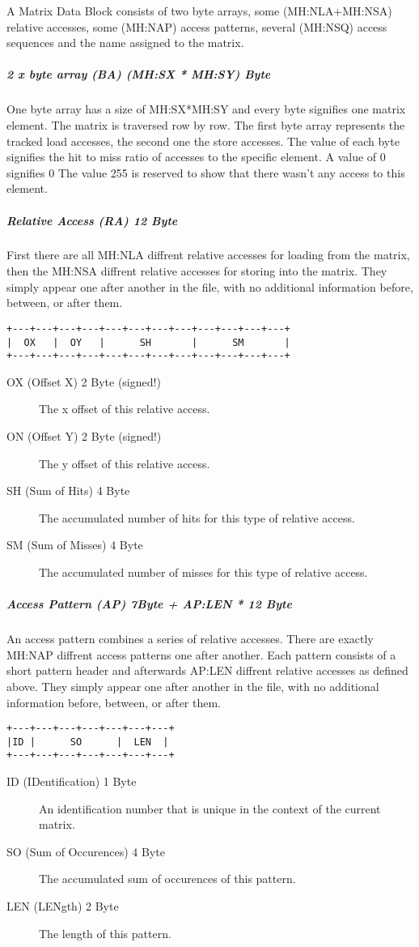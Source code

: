 A Matrix Data Block consists of two byte arrays, some (MH:NLA+MH:NSA) relative accesses, some (MH:NAP) access 
patterns, several (MH:NSQ) access sequences and the name assigned to the matrix.

\subparagraph{2 x byte array (BA) (MH:SX * MH:SY) Byte}

One byte array has a size of MH:SX*MH:SY and every byte signifies one matrix element. The matrix is traversed 
row by row. The first byte array represents the tracked load accesses, the second one the store accesses. 
The value of each byte signifies the hit to miss ratio of accesses to the specific element. 
A value of 0 signifies 0%
The value 255 is reserved to show that there wasn't any access to this element.

\subparagraph{Relative Access (RA) 12 Byte}

First there are all MH:NLA diffrent relative accesses for loading from the matrix, then the MH:NSA diffrent 
relative accesses for storing into the matrix. They simply appear one after another in the file, with no 
additional information before, between, or after them.
\begin{verbatim}
+---+---+---+---+---+---+---+---+---+---+---+---+
|  OX   |  OY   |      SH       |      SM       |
+---+---+---+---+---+---+---+---+---+---+---+---+
\end{verbatim}
\begin{description}
\item[OX (Offset X) 2 Byte (signed!)]
The x offset of this relative access.
\item[ON (Offset Y) 2 Byte (signed!)]
The y offset of this relative access.
\item[SH (Sum of Hits) 4 Byte]
The accumulated number of hits for this type of relative access.
\item[SM (Sum of Misses) 4 Byte]
The accumulated number of misses for this type of relative access.
\end{description}

\subparagraph{Access Pattern (AP) 7Byte + AP:LEN * 12 Byte}

An access pattern combines a series of relative accesses. There are exactly MH:NAP diffrent access patterns
 one after another. Each pattern consists of a short pattern header and afterwards AP:LEN diffrent relative 
accesses as defined above. They simply appear one after another in the file, with no additional information 
before, between, or after them.
\begin{verbatim}
+---+---+---+---+---+---+---+
|ID |      SO      |  LEN  |
+---+---+---+---+---+---+---+
\end{verbatim}
\begin{description}
\item[ID (IDentification) 1 Byte]
An identification number that is unique in the context of the current matrix.
\item[SO (Sum of Occurences) 4 Byte]
The accumulated sum of occurences of this pattern.
\item[LEN (LENgth) 2 Byte]
The length of this pattern.
\end{description}

